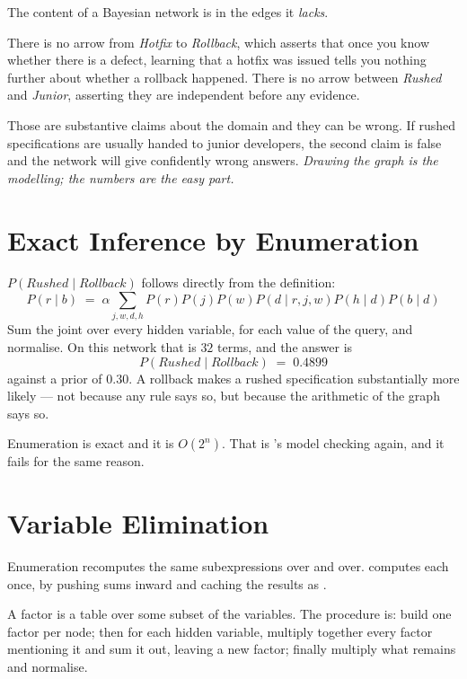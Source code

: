 \begin{alertbox}
The content of a Bayesian network is in the edges it \emph{lacks}.

There is no arrow from \emph{Hotfix} to \emph{Rollback}, which asserts that once you
know whether there is a defect, learning that a hotfix was issued tells you nothing
further about whether a rollback happened. There is no arrow between \emph{Rushed}
and \emph{Junior}, asserting they are independent before any evidence.

Those are substantive claims about the domain and they can be wrong. If rushed
specifications are usually handed to junior developers, the second claim is false
and the network will give confidently wrong answers. \emph{Drawing the graph is the
modelling; the numbers are the easy part.}
\end{alertbox}

\section{Exact Inference by Enumeration}

$P(\mathit{Rushed} \mid \mathit{Rollback})$ follows directly from the definition:
\[
  P(r \mid b) \;=\; \alpha \sum_{j,w,d,h} P(r)P(j)P(w)
  P(d \mid r,j,w) P(h \mid d) P(b \mid d)
\]
Sum the joint over every hidden variable, for each value of the query, and
normalise. On this network that is $32$ terms, and the answer is
\[
  P(\mathit{Rushed} \mid \mathit{Rollback}) \;=\; 0.4899
\]
against a prior of $0.30$. A rollback makes a rushed specification substantially
more likely --- not because any rule says so, but because the arithmetic of the
graph says so.

Enumeration is exact and it is $O(2^{n})$. That is 's model
checking again, and it fails for the same reason.

\section{Variable Elimination}

Enumeration recomputes the same subexpressions over and over.  computes each once, by pushing sums inward and caching the results as
.

A factor is a table over some subset of the variables. The procedure is: build one
factor per node; then for each hidden variable, multiply together every factor
mentioning it and sum it out, leaving a new factor; finally multiply what remains
and normalise.

